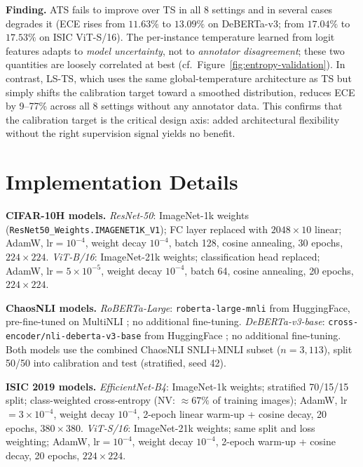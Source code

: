 \documentclass[10pt,journal,compsoc]{IEEEtran}
\begin{document}
\noindent\textbf{Finding.}
ATS fails to improve over TS in all 8 settings and in several cases degrades it (ECE rises from $11.63\%$ to $13.09\%$ on DeBERTa-v3; from $17.04\%$ to $17.53\%$ on ISIC ViT-S/16).  The per-instance temperature learned from logit features adapts to \emph{model uncertainty}, not to \emph{annotator disagreement}; these two quantities are loosely correlated at best (cf.\ Figure~\ref{fig:entropy-validation}).  In contrast, LS-TS, which uses the same global-temperature architecture as TS but simply shifts the calibration target toward a smoothed distribution, reduces ECE by 9--77\% across all 8 settings without any annotator data.  This confirms that the calibration target is the critical design axis: added architectural flexibility without the right supervision signal yields no benefit.

\section{Implementation Details}
\label{app:impl}

\noindent\textbf{CIFAR-10H models.}
\textit{ResNet-50}: ImageNet-1k weights (\texttt{ResNet50\_Weights.IMAGENET1K\_V1}); FC layer replaced with $2048\times 10$ linear; AdamW, lr$=10^{-4}$, weight decay $10^{-4}$, batch 128, cosine annealing, 30 epochs, $224\times224$.
\textit{ViT-B/16}: ImageNet-21k weights; classification head replaced; AdamW, lr$=5\times10^{-5}$, weight decay $10^{-4}$, batch 64, cosine annealing, 20 epochs, $224\times224$.

\noindent\textbf{ChaosNLI models.}
\textit{RoBERTa-Large}: \texttt{roberta-large-mnli} from HuggingFace, pre-fine-tuned on MultiNLI \cite{liu2019roberta}; no additional fine-tuning.
\textit{DeBERTa-v3-base}: \texttt{cross-encoder/nli-deberta-v3-base} from HuggingFace \cite{he2021debertav3}; no additional fine-tuning.
Both models use the combined ChaosNLI SNLI+MNLI subset ($n=3{,}113$), split 50/50 into calibration and test (stratified, seed 42).

\noindent\textbf{ISIC 2019 models.}
\textit{EfficientNet-B4}: ImageNet-1k weights; stratified 70/15/15 split; class-weighted cross-entropy (NV: ${\approx}67\%$ of training images); AdamW, lr$=3\times10^{-4}$, weight decay $10^{-4}$, 2-epoch linear warm-up + cosine decay, 20 epochs, $380\times380$.
\textit{ViT-S/16}: ImageNet-21k weights; same split and loss weighting; AdamW, lr$=10^{-4}$, weight decay $10^{-4}$, 2-epoch warm-up + cosine decay, 20 epochs, $224\times224$.
\end{document}
